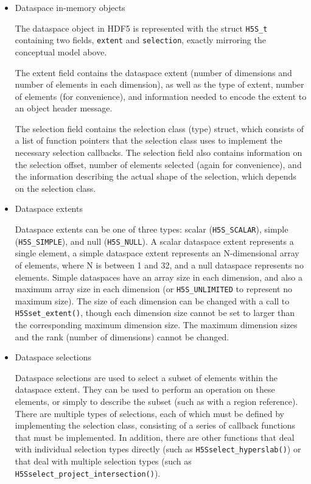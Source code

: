 \begin{itemize}
    \item Dataspace in-memory objects

The dataspace object in HDF5 is represented with the struct \texttt{H5S\_t} containing two fields, \texttt{extent} and \texttt{selection}, exactly mirroring the conceptual model above.

The extent field contains the dataspace extent (number of dimensions and number of elements in each dimension), as well as the type of extent, number of elements (for convenience), and information needed to encode the extent to an object header message.

The selection field contains the selection class (type) struct, which consists of a list of function pointers that the selection class uses to implement the necessary selection callbacks. The selection field also contains information on the selection offset, number of elements selected (again for convenience), and the information describing the actual shape of the selection, which depends on the selection class.

    \item Dataspace extents

Dataspace extents can be one of three types: scalar (\texttt{H5S\_SCALAR}), simple (\texttt{H5S\_SIMPLE}), and null (\texttt{H5S\_NULL}). A scalar dataspace extent represents a single element, a simple dataspace extent represents an N-dimensional array of elements, where N is between 1 and 32, and a null dataspace represents no elements. Simple dataspaces have an array size in each dimension, and also a maximum array size in each dimension (or \texttt{H5S\_UNLIMITED} to represent no maximum size). The size of each dimension can be changed with a call to \texttt{H5Sset\_extent()}, though each dimension size cannot be set to larger than the corresponding maximum dimension size. The maximum dimension sizes and the rank (number of dimensions) cannot be changed.

    \item Dataspace selections

Dataspace selections are used to select a subset of elements within the dataspace extent. They can be used to perform an operation on these elements, or simply to describe the subset (such as with a region reference). There are multiple types of selections, each of which must be defined by implementing the selection class, consisting of a series of callback functions that must be implemented. In addition, there are other functions that deal with individual selection types directly (such as \texttt{H5Sselect\_hyperslab()}) or that deal with multiple selection types (such as \texttt{H5Sselect\_project\_intersection()}).


\end{itemize}
